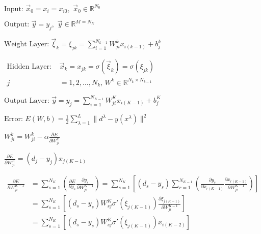 \documentclass[multi={mymath},border=1pt]{standalone}
\newenvironment{mymath}{$\displaystyle}{$}
\def\R{{\mathbb R}}
\begin{document}
\begin{mymath}
\textrm{Input: } \vec{x}_0 = x_i = x_{i0}, \,\,\vec{x}_0 \in \R^{N_0}
\end{mymath}

\begin{mymath}
\textrm{Output: } \vec{y} = y_j, \,\,\vec{y} \in \R^{M = N_K}
\end{mymath}

\begin{mymath}
\textrm{Weight Layer: } \vec{\xi}_k = \xi_{jk} = \sum_{i=1}^{N_{k-1}} W^k_{ji} x_{i(k-1)} + b^k_j
\end{mymath}

\begin{mymath}
  \begin{aligned}
    \textrm{Hidden Layer: } &\vec{x}_k = x_{jk} = \sigma(\vec{\xi}_k) = \sigma(\xi_{jk}) \\
    j &= 1, 2, \dots, N_k, \, W^k \in \R^{N_k \times N_{k-1}}
  \end{aligned}
\end{mymath}

\begin{mymath}
\textrm{Output Layer: } \vec{y} = y_j = \sum_{i=1}^{N_{K-1}} W^K_{ji} x_{i(K-1)} + b^K_j
\end{mymath}

\begin{mymath}
\textrm{Error: } E(W, b) = \frac{1}{2} \sum_{\lambda=1}^L \| d^{\lambda} - y(x^{\lambda}) \|^2
\end{mymath}

\begin{mymath}
W^k_{ji} = W^k_{ji} - \alpha \frac{\partial E}{\partial W^k_{ji}}
\end{mymath}

\begin{mymath}
  \frac{\partial E}{\partial W^K_{ji}} = (d_j - y_j) x_{j(K-1)}
\end{mymath}

\begin{mymath}
  \begin{aligned}
    \frac{\partial E}{\partial W^{K-1}_{ji}} &= \sum_{s=1}^{N_K} \left( \frac{\partial E}{\partial y_s} \frac{\partial y_s}{\partial W^{K-1}_{ji}} \right) = \sum_{s=1}^{N_K} \left[ (d_s - y_s) \sum_{r=1}^{N_{K-1}} \left( \frac{\partial y_s}{\partial x_{r(K-1)}} \frac{\partial x_{r(K-1)}}{\partial W^{K-1}_{ji}} \right) \right] \\
    &= \sum_{s=1}^{N_K} \left[ (d_s - y_s) W^K_{sj} \sigma'(\xi_{j(K-1)})  \frac{\partial \xi_{j(K-1)}}{\partial W^{K-1}_{ji}} \right] \\
    &= \sum_{s=1}^{N_K} \left[ (d_s - y_s) W^K_{sj} \sigma'(\xi_{j(K-1)}) x_{i(K-2)} \right]
  \end{aligned}
\end{mymath}
\end{document}
